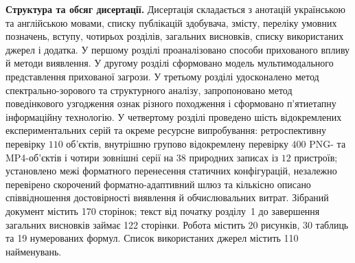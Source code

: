 \textbf{Структура та обсяг дисертації.}
Дисертація складається з анотацій українською та англійською мовами, списку публікацій здобувача, змісту, переліку умовних позначень, вступу, чотирьох розділів, загальних висновків, списку використаних джерел і додатка. У першому розділі проаналізовано способи прихованого впливу й методи виявлення. У другому розділі сформовано модель мультимодального представлення прихованої загрози. У третьому розділі удосконалено метод спектрально-зорового та структурного аналізу, запропоновано метод поведінкового узгодження ознак різного походження і сформовано п’ятиетапну інформаційну технологію. У четвертому розділі проведено шість відокремлених експериментальних серій та окреме ресурсне випробування: ретроспективну перевірку $110$ об’єктів, внутрішню групово відокремлену перевірку $400$ PNG- та MP4-об’єктів і чотири зовнішні серії на $38$ природних записах із $12$ пристроїв; установлено межі форматного перенесення статичних конфігурацій, незалежно перевірено скорочений форматно-адаптивний шлюз та кількісно описано співвідношення достовірності виявлення й обчислювальних витрат. Зібраний документ містить 170 сторінок; текст від початку розділу~1 до завершення загальних висновків займає 122 сторінки. Робота містить 20 рисунків, 30 таблиць та 19 нумерованих формул. Список використаних джерел містить 110 найменувань.

\clearpage
